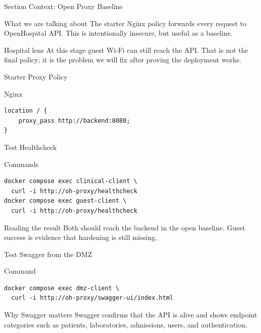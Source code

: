 \documentclass[presentation]{beamer}
\begin{document}
\begin{frame}[c]{Section Context: Open Proxy Baseline}
\begin{block}{What we are talking about}
The starter Nginx policy forwards every request to OpenHospital API. This is intentionally insecure,
but useful as a baseline.
\end{block}

\begin{exampleblock}{Hospital lens}
At this stage guest Wi-Fi can still reach the API. That is not the final policy; it is the problem
we will fix after proving the deployment works.
\end{exampleblock}
\end{frame}

\begin{frame}[fragile,c]{Starter Proxy Policy}
\begin{block}{Nginx}
\begin{verbatim}
location / {
    proxy_pass http://backend:8080;
}
\end{verbatim}
\end{block}
\end{frame}

\begin{frame}[fragile,c]{Test Healthcheck}
\begin{block}{Commands}
\begin{verbatim}
docker compose exec clinical-client \
  curl -i http://oh-proxy/healthcheck
docker compose exec guest-client \
  curl -i http://oh-proxy/healthcheck
\end{verbatim}
\end{block}

\begin{exampleblock}{Reading the result}
Both should reach the backend in the open baseline. Guest success is evidence that hardening is
still missing.
\end{exampleblock}
\end{frame}

\begin{frame}[fragile,c]{Test Swagger from the DMZ}
\begin{block}{Command}
\begin{verbatim}
docker compose exec dmz-client \
  curl -i http://oh-proxy/swagger-ui/index.html
\end{verbatim}
\end{block}

\begin{exampleblock}{Why Swagger matters}
Swagger confirms that the API is alive and shows endpoint categories such as patients, laboratories,
admissions, users, and authentication.
\end{exampleblock}
\end{frame}
\end{document}
